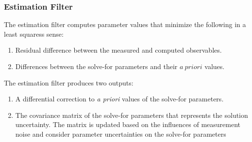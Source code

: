 \documentclass{article}
\begin{document}
                \subsubsection{\footnotesize{Estimation Filter}}
                    The estimation filter computes parameter values
                    that minimize the following in a
                    \glspl{least squares} sense:
                    \begin{enumerate}
                        \item Residual difference between the
                              measured and computed observables.
                        \item Differences between the solve-for
                              parameters and their $a\ priori$ values.
                    \end{enumerate}
                    The estimation filter produces two outputs:
                    \begin{enumerate}
                        \item A differential correction to
                              \textit{a priori} values of the
                              \gls{solve-for parameters}.
                        \item The \gls{covariance matrix}
                              of the \gls{solve-for parameters}
                              that represents the solution
                              uncertainty. The matrix is updated
                              based on the influences of
                              measurement noise and
                                      {consider parameter}
                              uncertainties on the
                              \gls{solve-for parameters}
                    \end{enumerate}
\end{document}
